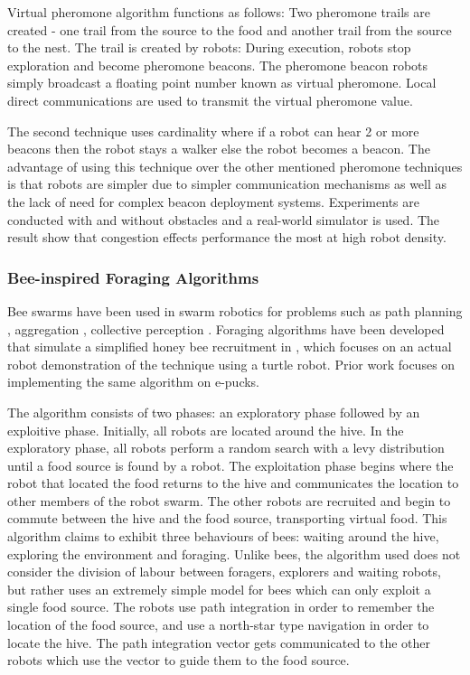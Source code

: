 Virtual pheromone algorithm functions as follows: Two pheromone trails are created - one trail from the source to the food and another trail from the source to the nest. The trail is created by robots: During execution, robots stop exploration and become pheromone beacons. The pheromone beacon robots simply broadcast a floating point number known as virtual pheromone. 
Local direct communications are used to transmit the virtual pheromone value.

The second technique uses cardinality where if a robot can hear 2 or more beacons then the robot stays a walker else the robot becomes a beacon. The advantage of using this technique over the other mentioned pheromone techniques is that robots are simpler due to simpler communication mechanisms as well as the lack of need for complex beacon deployment systems. Experiments are conducted with and without obstacles and a real-world simulator is used. The result show that congestion effects performance the most at high robot density. %

\subsubsection{Bee-inspired Foraging Algorithms}
Bee swarms have been used in swarm robotics for problems such as path planning \cite{lin2009chaotic}, aggregation \cite{kernbach2009re}, collective perception \cite{schmickl2007collective}. Foraging algorithms have been developed that simulate a simplified honey bee recruitment in \cite{alers2014biologically}, which focuses on an actual robot demonstration of the technique using a turtle robot. Prior work focuses on implementing the same algorithm on e-pucks. 

The algorithm consists of two phases: an exploratory phase followed by an exploitive phase. Initially, all robots are located around the hive. In the exploratory phase, all robots perform a random search with a levy distribution until a food source is found by a robot. The exploitation phase begins where the robot that located the food returns to the hive and communicates the location to other members of the robot swarm. The other robots are recruited and begin to commute between the hive and the food source, transporting virtual food. This algorithm claims to exhibit three behaviours of bees: waiting around the hive, exploring the environment and foraging. Unlike bees, the algorithm used does not consider the division of labour between foragers, explorers and waiting robots, but rather uses an extremely simple model for bees which can only exploit a single food source. The robots use path integration in order to remember the location of the food source, and use a north-star type navigation in order to locate the hive. The path integration vector gets communicated to the other robots which use the vector to guide them to the food source. 


